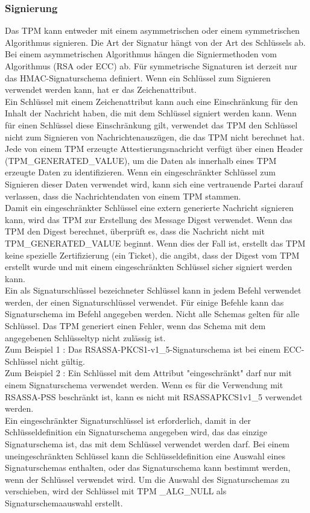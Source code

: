 \subsubsection{Signierung}
Das TPM kann entweder mit einem asymmetrischen oder einem symmetrischen Algorithmus signieren. Die Art der Signatur hängt von der Art des Schlüssels ab. Bei einem asymmetrischen Algorithmus hängen die Signiermethoden vom Algorithmus (RSA oder ECC) ab. Für symmetrische Signaturen ist derzeit nur das HMAC-Signaturschema definiert. Wenn ein Schlüssel zum Signieren verwendet werden kann, hat er das Zeichenattribut.
\\
Ein Schlüssel mit einem Zeichenattribut kann auch eine Einschränkung für den Inhalt der Nachricht haben, die mit dem Schlüssel signiert werden kann. Wenn für einen Schlüssel diese Einschränkung gilt, verwendet das TPM den Schlüssel nicht zum Signieren von Nachrichtenauszügen, die das TPM nicht berechnet hat.
\\
Jede von einem TPM erzeugte Attestierungsnachricht verfügt über einen Header (TPM\_GENERATED\_VALUE), um die Daten als innerhalb eines TPM erzeugte Daten zu identifizieren. Wenn ein eingeschränkter Schlüssel zum Signieren dieser Daten verwendet wird, kann sich eine vertrauende Partei darauf verlassen, dass die Nachrichtendaten von einem TPM stammen.
\\
Damit ein eingeschränkter Schlüssel eine extern generierte Nachricht signieren kann, wird das TPM zur Erstellung des Message Digest verwendet. Wenn das TPM den Digest berechnet, überprüft es, dass die Nachricht nicht mit TPM\_GENERATED\_VALUE beginnt. Wenn dies der Fall ist, erstellt das TPM keine spezielle Zertifizierung (ein Ticket), die angibt, dass der Digest vom TPM erstellt wurde und mit einem eingeschränkten Schlüssel sicher signiert werden kann.
\\
Ein als Signaturschlüssel bezeichneter Schlüssel kann in jedem Befehl verwendet werden, der einen Signaturschlüssel verwendet. Für einige Befehle kann das Signaturschema im Befehl angegeben werden. Nicht alle Schemas gelten für alle Schlüssel. Das TPM generiert einen Fehler, wenn das Schema mit dem angegebenen Schlüsseltyp nicht zulässig ist.
\\
Zum Beispiel 1 : Das RSASSA-PKCS1-v1\_5-Signaturschema ist bei einem ECC-Schlüssel nicht gültig.
\\
Zum Beispiel 2 : Ein Schlüssel mit dem Attribut "eingeschränkt" darf nur mit einem Signaturschema verwendet werden. Wenn es für die Verwendung mit RSASSA-PSS beschränkt ist, kann es nicht mit RSASSA\-PKCS1\-v1\_5 verwendet werden.
\\
Ein eingeschränkter Signaturschlüssel ist erforderlich, damit in der Schlüsseldefinition ein Signaturschema angegeben wird, das das einzige Signaturschema ist, das mit dem Schlüssel verwendet werden darf. Bei einem uneingeschränkten Schlüssel kann die Schlüsseldefinition eine Auswahl eines Signaturschemas enthalten, oder das Signaturschema kann bestimmt werden, wenn der Schlüssel verwendet wird. Um die Auswahl des Signaturschemas zu verschieben, wird der Schlüssel mit TPM \_ALG\_NULL als Signaturschemaauswahl erstellt.
